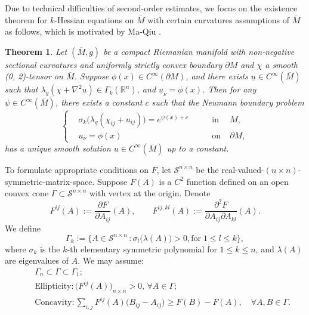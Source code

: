 \documentclass[12pt]{amsart}
\newtheorem{theorem}{Theorem}[section]
\theoremstyle{definition}
\theoremstyle{remark}
\numberwithin{equation}{section}
\begin{document}
Due to technical difficulties of second-order estimates, we focus on the existence theorem for $k$-Hessian equations on $\overline{M}$ with certain curvatures assumptions of $\overline{M}$ as follows, which is motivated by Ma-Qiu \cite{MaQiu19}.
\begin{theorem}\label{elliptic_Neumann_sigma_k}
	Let $(\overline{M}, g)$ be a compact Riemanian manifold with non-negative sectional curvatures and uniformly strictly convex boundary $\partial M$ and $\chi$ a smooth (0, 2)-tensor on $\overline{M}$.
	Suppose $\phi(x) \in C^{\infty} (\partial M)$, and there exists $\underline{u} \in C^{\infty}(\overline{M})$ such that $\lambda_g(\chi + \nabla^2 \underline{u}) \in \Gamma_k(\mathbb{R}^n)$\footnotemark, and $\underline{u}_\nu = \phi(x)$.
	Then for any $\psi \in C^{\infty}( \overline{M} )$, there exists a constant $c$ such that the Neumann boundary problem
	\begin{equation}\label{univ_conv_sigma_k_eq_intro}
	\left\{
	\begin{aligned}
	&\sigma_k\big(\lambda_g(\chi_{ij} + u_{ij})\big) = e^{\psi(x) + c} \qquad &\text{in}&\; M, \\ 
	&u_\nu = \phi(x) \qquad &\text{on}& \; \partial M,   
	\end{aligned}
	\right.
	\end{equation}
	has a unique smooth solution $u \in C^{\infty} (\overline{M})$ up to a constant.
\end{theorem}


To formulate appropriate conditions on $F$, let $\mathcal{S}^{n\times n}$ be the real-valued-$(n \times n)$-symmetric-matrix-space.
Suppose $F(A)$ is a $C^2$ function defined on an open convex cone $\Gamma \subset \mathcal{S}^{n\times n}$ with vertex at the origin.
Denote
$$F^{ij}(A) := \frac{\partial F}{\partial A_{ij}} (A), \qquad F^{ij, kl}(A) := \frac{\partial^2 F}{\partial A_{ij} \partial A_{kl}} (A).$$
We define
$$\Gamma_k := \big\{A\in\mathcal{S}^{n\times n} \,  : \sigma_l\big(\lambda(A)\big)>0, \text{for}\; 1\leq l \leq k\},$$
where $\sigma_k$ is the $k$-th elementary symmetric polynomial for $1\leq k \leq n$, and $\lambda(A)$ are eigenvalues of $A$.
We may assume:
\begin{align}
& \quad \Gamma_n \subset \Gamma \subset \Gamma_1;  \label{cone}\\
& \quad \text{Ellipticity:}\, \big(F^{ij}(A)\big)_{n\times n} >0, \, \forall A\in\Gamma; \label{ellipticity}\\
& \quad \text{Concavity:}\, \sum_{i,j} F^{ij}(A) \big( B_{ij} - A_{ij} \big) \geq F(B) - F(A), \quad \forall A,B \in \Gamma. \label{concavity}
\end{align}
\end{document}
